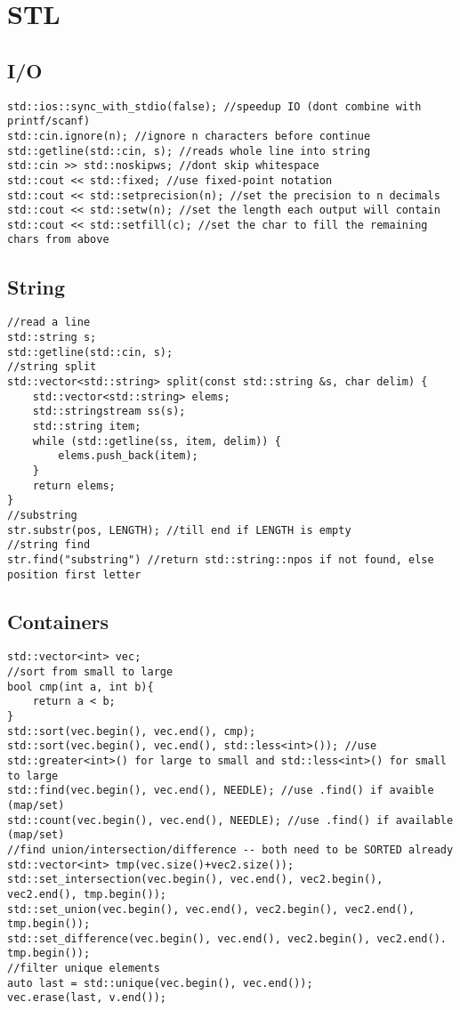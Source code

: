 \section{STL}
\subsection{I/O}
\begin{verbatim}
std::ios::sync_with_stdio(false); //speedup IO (dont combine with printf/scanf)
std::cin.ignore(n); //ignore n characters before continue
std::getline(std::cin, s); //reads whole line into string
std::cin >> std::noskipws; //dont skip whitespace
std::cout << std::fixed; //use fixed-point notation
std::cout << std::setprecision(n); //set the precision to n decimals
std::cout << std::setw(n); //set the length each output will contain
std::cout << std::setfill(c); //set the char to fill the remaining chars from above
\end{verbatim}
\subsection{String}
\begin{verbatim}
//read a line
std::string s;
std::getline(std::cin, s);
//string split
std::vector<std::string> split(const std::string &s, char delim) {
    std::vector<std::string> elems;
    std::stringstream ss(s);
    std::string item;
    while (std::getline(ss, item, delim)) {
        elems.push_back(item);
    }
    return elems;
}
//substring
str.substr(pos, LENGTH); //till end if LENGTH is empty
//string find
str.find("substring") //return std::string::npos if not found, else position first letter
\end{verbatim}

\subsection{Containers}
\begin{verbatim}
std::vector<int> vec;
//sort from small to large
bool cmp(int a, int b){
    return a < b;
}
std::sort(vec.begin(), vec.end(), cmp); 
std::sort(vec.begin(), vec.end(), std::less<int>()); //use std::greater<int>() for large to small and std::less<int>() for small to large
std::find(vec.begin(), vec.end(), NEEDLE); //use .find() if avaible (map/set)
std::count(vec.begin(), vec.end(), NEEDLE); //use .find() if available (map/set)
//find union/intersection/difference -- both need to be SORTED already
std::vector<int> tmp(vec.size()+vec2.size());
std::set_intersection(vec.begin(), vec.end(), vec2.begin(), vec2.end(), tmp.begin());
std::set_union(vec.begin(), vec.end(), vec2.begin(), vec2.end(), tmp.begin());
std::set_difference(vec.begin(), vec.end(), vec2.begin(), vec2.end(). tmp.begin());
//filter unique elements
auto last = std::unique(vec.begin(), vec.end());
vec.erase(last, v.end());
\end{verbatim}

